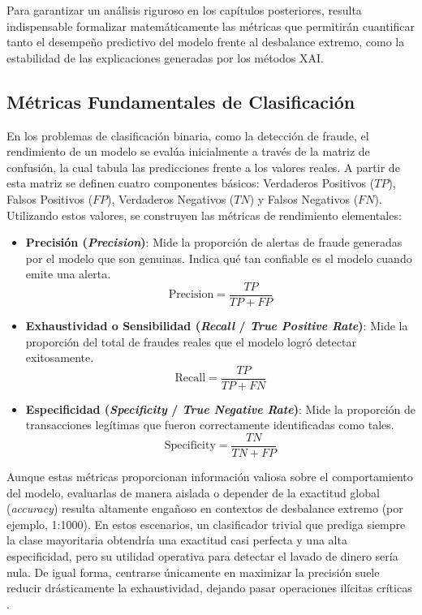 Para garantizar un análisis riguroso en los capítulos posteriores, resulta indispensable formalizar matemáticamente las métricas que permitirán cuantificar tanto el desempeño predictivo del modelo frente al desbalance extremo, como la estabilidad de las explicaciones generadas por los métodos XAI.

\subsection{Métricas Fundamentales de Clasificación}

En los problemas de clasificación binaria, como la detección de fraude, el rendimiento de un modelo se evalúa inicialmente a través de la matriz de confusión, la cual tabula las predicciones frente a los valores reales. A partir de esta matriz se definen cuatro componentes básicos: Verdaderos Positivos ($TP$), Falsos Positivos ($FP$), Verdaderos Negativos ($TN$) y Falsos Negativos ($FN$). Utilizando estos valores, se construyen las métricas de rendimiento elementales:

\begin{itemize}
    \item \textbf{Precisión (\textit{Precision})}: Mide la proporción de alertas de fraude generadas por el modelo que son genuinas. Indica qué tan confiable es el modelo cuando emite una alerta.
    \[ \text{Precision} = \frac{TP}{TP + FP} \]
    
    \item \textbf{Exhaustividad o Sensibilidad (\textit{Recall} / \textit{True Positive Rate})}: Mide la proporción del total de fraudes reales que el modelo logró detectar exitosamente.
    \[ \text{Recall} = \frac{TP}{TP + FN} \]
    
    \item \textbf{Especificidad (\textit{Specificity} / \textit{True Negative Rate})}: Mide la proporción de transacciones legítimas que fueron correctamente identificadas como tales.
    \[ \text{Specificity} = \frac{TN}{TN + FP} \]
\end{itemize}

Aunque estas métricas proporcionan información valiosa sobre el comportamiento del modelo, evaluarlas de manera aislada o depender de la exactitud global (\textit{accuracy}) resulta altamente engañoso en contextos de desbalance extremo (por ejemplo, 1:1000). En estos escenarios, un clasificador trivial que prediga siempre la clase mayoritaria obtendría una exactitud casi perfecta y una alta especificidad, pero su utilidad operativa para detectar el lavado de dinero sería nula. De igual forma, centrarse únicamente en maximizar la precisión suele reducir drásticamente la exhaustividad, dejando pasar operaciones ilícitas críticas \cite{Rai2025EvaluatingData}.


